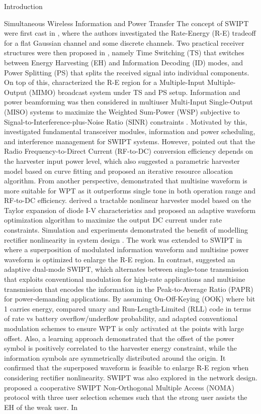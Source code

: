 \documentclass{IEEEtran}
\begin{document}
\begin{section}{Introduction}
\begin{subsection}{Simultaneous Wireless Information and Power Transfer}
		The concept of SWIPT were first cast in \cite{Varshney2008}, where the authors investigated the Rate-Energy (R-E) tradeoff for a flat Gaussian channel and some discrete channels. Two practical receiver structures were then proposed in \cite{Zhou2013}, namely Time Switching (TS) that switches between Energy Harvesting (EH) and Information Decoding (ID) modes, and Power Splitting (PS) that splits the received signal into individual components. On top of this, \cite{Zhang2013} characterized the R-E region for a Multiple-Input Multiple-Output (MIMO) broadcast system under TS and PS setup. Information and power beamforming was then considered in multiuser Multi-Input Single-Output (MISO) systems to maximize the Weighted Sum-Power (WSP) subjective to Signal-to-Interference-plus-Noise Ratio (SINR) constraints \cite{Xu2014}. Motivated by this, \cite{Krikidis2014} investigated fundamental transceiver modules, information and power scheduling, and interference management for SWIPT systems. However, \cite{Boshkovska2015} pointed out that the Radio Frequency-to-Direct Current (RF-to-DC) conversion efficiency depends on the harvester input power level, which also suggested a parametric harvester model based on curve fitting and proposed an iterative resource allocation algorithm. From another perspective, \cite{Trotter2009,Boaventura2011} demonstrated that multisine waveform is more suitable for WPT as it outperforms single tone in both operation range and RF-to-DC efficiency. \cite{Clerckx2016a} derived a tractable nonlinear harvester model based on the Taylor expansion of diode I-V characteristics and proposed an adaptive waveform optimization algorithm to maximize the output DC current under rate constraints. Simulation and experiments demonstrated the benefit of modelling rectifier nonlinearity in system design \cite{Kim2019,Kim2019a}. The work was extended to SWIPT in \cite{Clerckx2018} where a superposition of modulated information waveform and multisine power waveform is optimized to enlarge the R-E region. In contrast, \cite{Park2018} suggested an adaptive dual-mode SWIPT, which alternates between single-tone transmission that exploits conventional modulation for high-rate applications and multisine transmission that encodes the information in the Peak-to-Average Ratio (PAPR) for power-demanding applications. By assuming On-Off-Keying (OOK) where bit 1 carries energy, \cite{Hu2019} compared unary and Run-Length-Limited (RLL) code in terms of rate vs battery overflow/underflow probability, and adapted conventional modulation schemes to ensure WPT is only activated at the points with large offset. Also, a learning approach \cite{Varasteh2019c} demonstrated that the offset of the power symbol is positively correlated to the harvester energy constraint, while the information symbols are symmetrically distributed around the origin. It confirmed that the superposed waveform is feasible to enlarge R-E region when considering rectifier nonlinearity. SWIPT was also explored in the network design. \cite{Liu2016} proposed a cooperative SWIPT Non-Orthogonal Multiple Access (NOMA) protocol with three user selection schemes such that the strong user assists the EH of the weak user. In 
\end{subsection}
\end{section}
\end{document}
